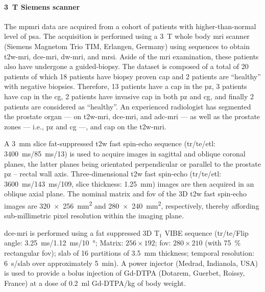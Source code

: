 \paragraph{\SI{3}{\tesla} Siemens scanner}

The \ac{mpmri} data are acquired from a cohort of patients with higher-than-normal level of \ac{psa}.
The acquisition is performed using a \SI{3}{\tesla} whole body \ac{mri} scanner (Siemens Magnetom Trio TIM, Erlangen, Germany) using sequences to obtain \ac{t2w}-\ac{mri}, \ac{dce}-\ac{mri}, \ac{dw}-\ac{mri}, and \ac{mrsi}.
Aside of the \ac{mri} examination, these patients also have undergone a guided-biopsy.
The dataset is composed of a total of 20 patients of which 18 patients have biopsy proven \ac{cap} and 2 patients are ``healthy'' with negative biopsies.
Therefore, 13 patients have a \ac{cap} in the \ac{pz}, 3 patients have \ac{cap} in the \ac{cg}, 2 patients have invasive \ac{cap} in both \ac{pz} and \ac{cg}, and finally 2 patients are considered as ``healthy''.
An experienced radiologist has segmented the prostate organ --- on \ac{t2w}-\ac{mri}, \ac{dce}-\ac{mri}, and \ac{adc}-\ac{mri} --- as well as the prostate zones --- i.e., \ac{pz} and \ac{cg} ---, and \ac{cap} on the \ac{t2w}-\ac{mri}.

A \SI{3}{\mm} slice fat-suppressed \ac{t2w} fast spin-echo sequence (\ac{tr}/\ac{te}/\ac{etl}: \SI{3400}{\ms}/\SI{85}{\ms}/13) is used to acquire images in sagittal and oblique coronal planes, the latter planes being orientated perpendicular or parallel to the prostate \ac{pz} – rectal wall axis.
Three-dimensional \ac{t2w} fast spin-echo (\ac{tr}/\ac{te}/\ac{etl}: \SI{3600}{\ms}/\SI{143}{\ms}/109, slice thickness: \SI{1.25}{\mm}) images are then acquired in an oblique axial plane.
The nominal matrix and \ac{fov} of the 3D \ac{t2w} fast spin-echo images are \SI[product-units=repeat]{320x256}{\milli\metre\squared} and \SI[product-units=repeat]{280x240}{\milli\metre\squared}, respectively, thereby affording sub-millimetric pixel resolution within the imaging plane.

\ac{dce}-\ac{mri} is performed using a fat suppressed 3D T$_1$ VIBE sequence (\ac{tr}/\ac{te}/Flip angle: \SI{3.25}{\ms}/\SI{1.12}{\ms}/\SI{10}{\degree}; Matrix: $256 \times 192$; \ac{fov}: $280 \times 210$ (with \SI{75}{\percent} rectangular \ac{fov}); slab of 16 partitions of \SI{3.5}{\mm} thickness; temporal resolution: \SI{6}{\s}/slab over approximately \SI{5}{\minute}).
A power injector (Medrad, Indianola, USA) is used to provide a bolus injection of Gd-DTPA (Dotarem, Guerbet, Roissy, France) at a dose of \SI{0.2}{\ml} Gd-DTPA/kg of body weight.

